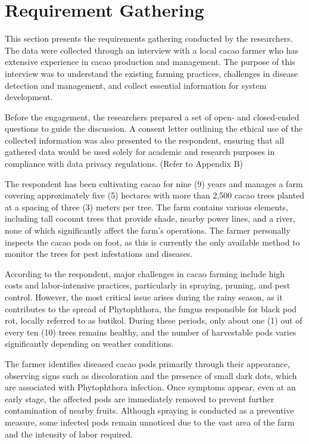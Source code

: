 \section{Requirement Gathering}

This section presents the requirements gathering conducted by the researchers. The data were collected through an interview with a local cacao farmer who has extensive experience in cacao production and management. The purpose of this interview was to understand the existing farming practices, challenges in disease detection and management, and collect essential information for system development. 

Before the engagement, the researchers prepared a set of open- and closed-ended questions to guide the discussion. A consent letter outlining the ethical use of the collected information was also presented to the respondent, ensuring that all gathered data would be used solely for academic and research purposes in compliance with data privacy regulations. (Refer to Appendix B) 

The respondent has been cultivating cacao for nine (9) years and manages a farm covering approximately five (5) hectares with more than 2,500 cacao trees planted at a spacing of three (3) meters per tree. The farm contains various elements, including tall coconut trees that provide shade, nearby power lines, and a river, none of which significantly affect the farm’s operations. The farmer personally inspects the cacao pods on foot, as this is currently the only available method to monitor the trees for pest infestations and diseases.

According to the respondent, major challenges in cacao farming include high costs and labor-intensive practices, particularly in spraying, pruning, and pest control. However, the most critical issue arises during the rainy season, as it contributes to the spread of Phytophthora, the fungus responsible for black pod rot, locally referred to as butikol. During these periods, only about one (1) out of every ten (10) trees remains healthy, and the number of harvestable pods varies significantly depending on weather conditions.

The farmer identifies diseased cacao pods primarily through their appearance, observing signs such as discoloration and the presence of small dark dots, which are associated with Phytophthora infection. Once symptoms appear, even at an early stage, the affected pods are immediately removed to prevent further contamination of nearby fruits. Although spraying is conducted as a preventive measure, some infected pods remain unnoticed due to the vast area of the farm and the intensity of labor required.

